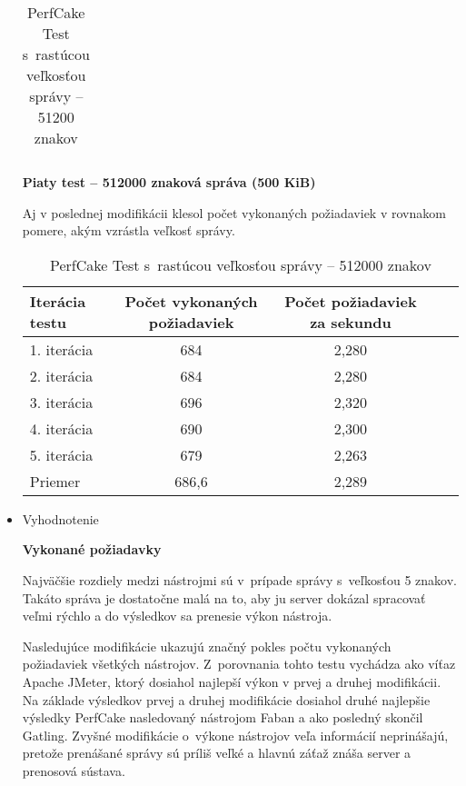 \documentclass[12pt,oneside,final]{fithesis-utf8}
\begin{document}
\begin{itemize}
\begin{table}[H]
\begin{center}
\begin{tabular}{ | l | c | c | c | c |}
\end{tabular}
\end{center}
\caption{PerfCake Test s~rastúcou veľkosťou správy -- 51200 znakov}
\end{table}


\textbf{Piaty test -- 512000 znaková správa (500 KiB)}

Aj v poslednej modifikácii klesol počet vykonaných požiadaviek v rovnakom pomere, akým vzrástla veľkosť správy.

\begin{table}[H]
\begin{center}
\begin{tabular}{ | l | c | c | c | c |}
		\hline
		 \textbf{Iterácia testu} & \textbf{Počet vykonaných požiadaviek} & \textbf{Počet požiadaviek za sekundu} \\ \hline
		 1. iterácia & 684 & 2,280 \\ \hline
		 2. iterácia & 684 & 2,280 \\ \hline
		 3. iterácia & 696 & 2,320 \\ \hline
		 4. iterácia & 690 & 2,300 \\ \hline
		 5. iterácia & 679 & 2,263 \\ \hline
		 Priemer & 686,6 & 2,289 \\ \hline
		 
\end{tabular}
\end{center}
\caption{PerfCake Test s~rastúcou veľkosťou správy -- 512000 znakov}
\end{table}


\item Vyhodnotenie

\textbf{Vykonané požiadavky}

Najväčšie rozdiely medzi nástrojmi sú v~prípade správy s~veľkosťou 5 znakov. Takáto správa je dostatočne malá na to, aby ju server dokázal spracovať veľmi rýchlo a do výsledkov sa prenesie výkon nástroja.
\par Nasledujúce modifikácie ukazujú značný pokles počtu vykonaných požiadaviek všetkých nástrojov. Z~porovnania tohto testu vychádza ako víťaz Apache JMeter, ktorý dosiahol najlepší výkon v prvej a druhej modifikácii. Na základe výsledkov prvej a druhej modifikácie dosiahol druhé najlepšie výsledky PerfCake nasledovaný nástrojom Faban a ako posledný skončil Gatling. Zvyšné modifikácie o~výkone nástrojov veľa informácií neprinášajú, pretože prenášané správy sú príliš veľké a hlavnú záťaž znáša server a prenosová sústava.


\end{itemize}
\end{document}
